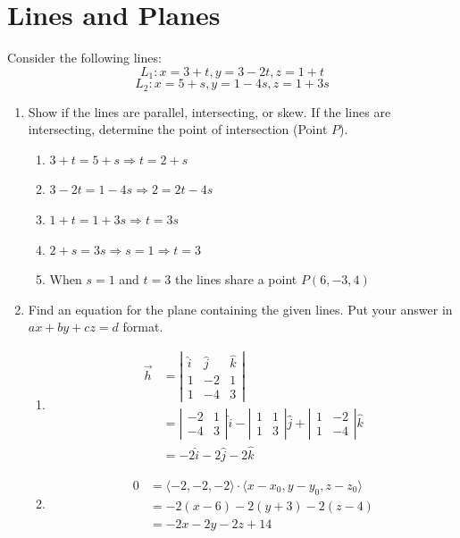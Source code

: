 \documentclass[letter,11pt]{article}
\begin{document}
\section{Lines and Planes}
Consider the following lines:
$$L_{1}: x=3+t, y=3-2t, z=1+t$$
$$L_{2}: x=5+s, y=1-4s, z=1+3s$$
\begin{enumerate}[label=\Alph*.]
    \item  Show if the lines are parallel, intersecting, or skew. If the lines are intersecting, determine the point of intersection (Point $P$).
    \begin{enumerate}
        \item $3+t=5+s \Longrightarrow t=2+s$
        \item $3-2t=1-4s \Longrightarrow 2=2t-4s$
        \item $1+t=1+3s \Longrightarrow t=3s$
        \item $2+s=3s \Longrightarrow s=1 \Longrightarrow t=3$
        \item When $s=1$ and $t=3$ the lines share a point $P(6,-3,4)$
    \end{enumerate}
    \item Find an equation for the plane containing the given lines. Put your answer in $ax + by + cz = d$ format.
    \begin{enumerate}
        \item \begin{align*}\vec{h} &= \left|\begin{matrix} \hat{i} & \hat{j} & \hat{k} \\ 1 & -2 & 1 \\ 1 & -4 & 3 \end{matrix}\right| \\ &= \left|\begin{matrix} -2 & 1 \\ -4 & 3 \end{matrix}\right| \hat{i} -  \left|\begin{matrix} 1 & 1 \\ 1 & 3 \end{matrix}\right| \hat{j} +  \left|\begin{matrix} 1 & -2 \\ 1 & -4 \end{matrix}\right| \hat{k} \\ &= -2\hat{i} -2\hat{j}-2\hat{k} \end{align*}
        \item \begin{align*} 0 &=\langle-2,-2,-2\rangle \cdot \langle x-x_0,y-y_0,z-z_0\rangle\\ & = -2(x-6)-2(y+3)-2(z-4)\\ &= -2x-2y-2z +14 \end{align*}

\end{enumerate}
\end{enumerate}
\end{document}
